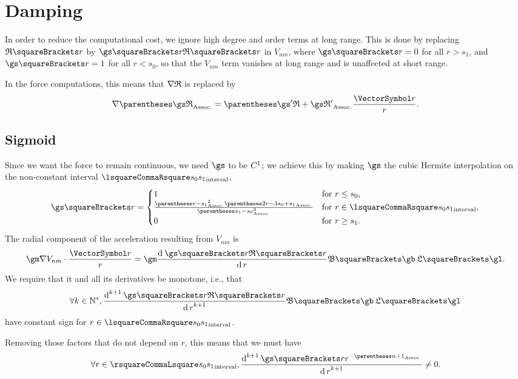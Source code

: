 \documentclass[10pt, a4paper, twoside]{basestyle}
\begin{document}
\section*{Damping}
In order to reduce the computational cost, we ignore high degree and order terms at long range.
This is done by replacing $\mathfrak R\of{r}$ by $\gs\of r \mathfrak R\of r$ in $V_{nm}$, where
$\gs\of r = 0$ for all $r>s_1$, and $\gs\of r = 1$ for all $r<s_0$, so that the $V_{nm}$ term
vanishes at long range and is unaffected at short range.

In the force computations, this means that $\grad\mathfrak R$ is replaced by\[
\grad \pa{\gs\mathfrak R} = \pa{\gs'\mathfrak R + \gs\mathfrak R'} \frac \vr r\text.
\]

\subsection*{Sigmoid}
Since we want the force to remain continuous, we need $\gs$ to be $\Cont[1]$; we achieve this by
making $\gs$ the cubic Hermite interpolation on the non-constant interval $\intclos {s_0} {s_1}$,
\[
\gs\of r=
\begin{cases}
1 &\text{for }r \leq s_0\text, \\
\frac{\pa{r-s_1}^2\pa{2r-3s_0+s_1}}{\pa{s_1-s_0}^3} &\text{for }r \in \intclos {s_0} {s_1}\text, \\
0 &\text{for }r \geq s_1\text.
\end{cases}
\]
The radial component of the acceleration resulting from $V_{nm}$ is 
\[
\gm\InnerProduct {\grad V_{nm}}{\frac \vr r} = \gm \deriv r {{\gs\of r \mathfrak R\of r}}{\mathfrak B\of \gb}\,{\mathfrak L\of \gl}\text.
\]
We require that it and all its derivatives be monotone, i.e., that
\[
\forall k \in \Positives, \deriv[k+1] r {\gs\of r \mathfrak R\of r}{\mathfrak B\of \gb}\,{\mathfrak L\of \gl}
\]
have constant sign for $r \in \intclos {s_0} {s_1}$.

Removing those factors that do not depend on $r$, this means that we must have
\begin{equation}
\forall r \in \intopen{s_0} {s_1}, \deriv[k+1] r {\gs\of r r^{-\pa{n+1}}} \neq 0\label{eqnderiv}\text.
\end{equation}
\end{document}
